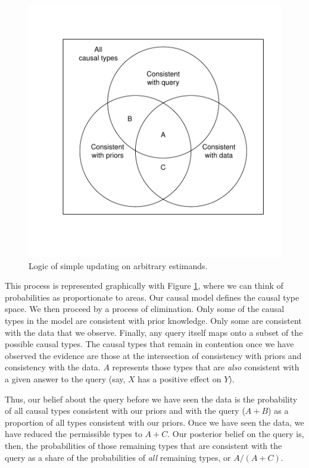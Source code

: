 \documentclass[
  12pt,
]{book}
\begin{document}
\begin{figure}
\centering
\includegraphics{ii_files/figure-latex/ptvenn-1.pdf}
\caption{\label{fig:ptvenn}Logic of simple updating on arbitrary estimands.}
\end{figure}

This process is represented graphically with Figure \ref{fig:ptvenn}, where we can think of probabilities as proportionate to areas. Our causal model defines the causal type space. We then proceed by a process of elimination. Only some of the causal types in the model are consistent with prior knowledge. Only some are consistent with the data that we observe. Finally, any query itself maps onto a subset of the possible causal types. The causal types that remain in contention once we have observed the evidence are those at the intersection of consistency with priors and consistency with the data. \(A\) represents those types that are \emph{also} consistent with a given answer to the query (say, \(X\) has a positive effect on \(Y\)).

Thus, our belief about the query before we have seen the data is the probability of all causal types consistent with our priors and with the query (\(A + B\)) as a proportion of all types consistent with our priors. Once we have seen the data, we have reduced the permissible types to \(A + C\). Our posterior belief on the query is, then, the probabilities of those remaining types that are consistent with the query as a share of the probabilities of \emph{all} remaining types, or \(A/(A+C)\).
\end{document}
